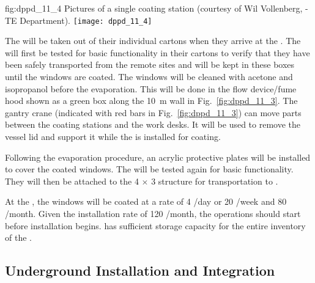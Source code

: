 \begin{dunefigure}{fig:dppd_11_4}
{Pictures of a single  coating station (courtesy of Wil Vollenberg, -TE Department).}
\texttt{[image: dppd\_11\_4]}
\end{dunefigure}

The  will be taken out of their individual cartons when they arrive at the . The  will first be tested for basic functionality in their cartons to verify that they have been safely transported from the remote sites and will be kept in these boxes until the windows are coated. The  windows will be cleaned with acetone and isopropanol before the evaporation. This will be done in the flow device/fume hood shown as a green box along the \SI{10}{\m} wall in Fig.~\ref{fig:dppd_11_3}. The gantry crane (indicated with red bars in Fig.~\ref{fig:dppd_11_3}) can move parts between the coating stations and the work desks. It will be used to remove the vessel lid and support it while the  is installed for coating.

Following the evaporation procedure, an acrylic protective plates will be installed to cover the coated  windows.
The  will be tested again for basic functionality. They will then be attached to the \num{4} $\times$ \num{3} structure for transportation to \surf.

At the , the  windows will be coated at a rate of \num{4} /day or \num{20} /week and \num{80} /month. Given the installation rate of \num{120} /month, the  operations should start before installation begins.  has sufficient storage capacity for the entire  inventory of the . 

\subsection{Underground Installation and Integration}
\label{subsec:dp-pds-undergroundinstallation}

